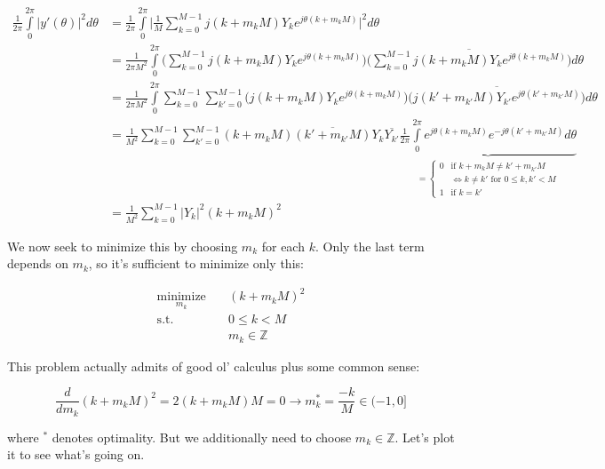 \documentclass[10pt]{article}
\begin{document}
\begin{align*}
\frac{1}{2\pi} \int\limits_{0}^{2\pi} |y'(\theta)|^2 d\theta &= \frac{1}{2\pi} \int\limits_{0}^{2\pi} \Big|\frac{1}{M} \sum_{k=0}^{M-1} j(k + m_k M) Y_k e^{j \theta (k + m_k M)} \Big|^2 d\theta \\
&= \frac{1}{2\pi M^2} \int\limits_{0}^{2\pi} \Big( \sum_{k=0}^{M-1} j(k + m_k M) Y_k e^{j \theta (k + m_k M)} \Big) \overline{\Big( \sum_{k=0}^{M-1} j(k + m_k M) Y_k e^{j \theta (k + m_k M)} \Big)} d\theta \\
&= \frac{1}{2\pi M^2} \int\limits_{0}^{2\pi} \sum_{k=0}^{M-1} \sum_{k'=0}^{M-1} \Big( j(k + m_k M) Y_k e^{j \theta (k + m_k M)} \Big) \overline{\Big( j(k' + m_{k'} M) Y_{k'} e^{j \theta (k' + m_{k'} M)} \Big)} d\theta \\
&= \frac{1}{M^2} \sum_{k=0}^{M-1} \sum_{k'=0}^{M-1} (k + m_k M) \overline{(k' + m_{k'} M)} Y_k \overline{Y_{k'}} \underbrace{\frac{1}{2\pi} \int\limits_{0}^{2\pi} e^{j \theta (k + m_k M)} e^{-j \theta (k' + m_{k'} M)} d\theta}_{= \begin{cases} 0 & \text{if } k + m_k M \neq k' + m_{k'} M \\ & \iff k \neq k' \text{ for } 0 \leq k, k' < M \\ 1 & \text{if } k = k'\end{cases}} \\
&= \frac{1}{M^2} \sum_{k=0}^{M-1} |Y_k|^2 (k + m_k M)^2
\end{align*}

We now seek to minimize this by choosing $m_k$ for each $k$. Only the last term depends on $m_k$, so it's sufficient to minimize only this:

\begin{align*}
\underset{m_k}{\text{minimize}} \quad & (k + m_k M)^2 \\
\text{s.t.} \quad & 0 \leq k < M \\
	& m_k \in \mathbb{Z}
\end{align*}

This problem actually admits of good ol' calculus plus some common sense:

$$ \frac{d}{dm_k} (k + m_k M)^2 = 2(k + m_k M)M = 0 \longrightarrow m_k^* = \frac{-k}{M} \in (-1, 0] $$

where $^*$ denotes optimality. But we additionally need to choose $m_k \in \mathbb{Z}$. Let's plot it to see what's going on.
\end{document}
